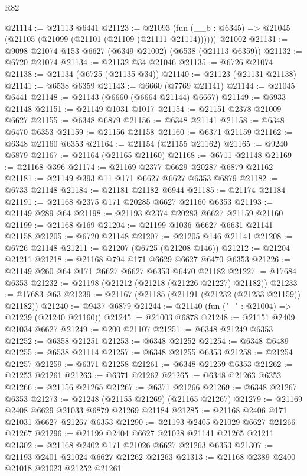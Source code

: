 \begin{lexlean}{R82}
\begin{coremodule}
@21114 := @21113 @6441
@21123 := @21093
    (fun (__b : @6345) => @21045 (@21105 (@21099 (@21101 (@21109 (@21111 @21114))))))
    @21002
@21131 := @9098 @21074 @153 @6627 (@6349 @21002) (@6538 (@21113 @6359))
@21132 := @6720 @21074
@21134 := @21132 @34 @21046
@21135 := @6726 @21074
@21138 := @21134 (@6725 (@21135 @34))
@21140 := @21123 (@21131 @21138)
@21141 := @6538 @6359
@21143 := @6660 (@7769 @21141)
@21144 := @21045 @6441
@21148 := @21143 (@6660 (@6664 @21144) @6667)
@21149 := @6933 @21148
@21151 := @21149 @1031 @1017
@21154 := @21151 @2378 @21009 @6627
@21155 := @6348 @6879
@21156 := @6348 @21141
@21158 := @6348 @6470 @6353
@21159 := @21156 @21158
@21160 := @6371 @21159
@21162 := @6348 @21160 @6353
@21164 := @21154 (@21155 @21162)
@21165 := @9240 @6879
@21167 := @21164 (@21165 @21160)
@21168 := @6711 @21148
@21169 := @21168 @396
@21174 := @21169 @2377 @6629 @20287 @6879 @21162
@21181 := @21149 @393 @11 @171 @6627 @6627 @6353 @6879
@21182 := @6733 @21148
@21184 := @21181 @21182 @6944
@21185 := @21174 @21184
@21191 := @21168 @2375 @171 @20285 @6627 @21160 @6353
@21193 := @21149 @289 @64
@21198 := @21193 @2374 @20283 @6627 @21159 @21160
@21199 := @21168 @169
@21204 := @21199 @1036 @6627 @6631 @21141 @21158
@21205 := @6720 @21148
@21207 := @21205 @146 @21141
@21208 := @6726 @21148
@21211 := @21207 (@6725 (@21208 @146))
@21212 := @21204 @21211
@21218 := @21168 @794 @171 @6629 @6627 @6470 @6353
@21226 := @21149 @260 @64 @171 @6627 @6627 @6353 @6470 @21182
@21227 := @17684 @6353
@21232 := @21198 (@21212 (@21218 (@21226 @21227) @21182))
@21233 := @17683 @63
@21239 := @21167 (@21185 (@21191 (@21232 (@21233 @21159)) @21182))
@21240 := @9437 @6879
@21244 := @21140 (fun ("_" : @21004) => @21239 (@21240 @21160))
@21245 := @21003 @6878
@21248 := @21151 @2409 @21034 @6627
@21249 := @200 @21107
@21251 := @6348 @21249 @6353
@21252 := @6358 @21251
@21253 := @6348 @21252
@21254 := @6348 @6489
@21255 := @6538 @21114
@21257 := @6348 @21255 @6353
@21258 := @21254 @21257
@21259 := @6371 @21258
@21261 := @6348 @21259 @6353
@21262 := @21253 @21261
@21263 := @6371 @21262
@21265 := @6348 @21263 @6353
@21266 := @21156 @21265
@21267 := @6371 @21266
@21269 := @6348 @21267 @6353
@21273 := @21248 (@21155 @21269) (@21165 @21267)
@21279 := @21169 @2408 @6629 @21033 @6879 @21269 @21184
@21285 := @21168 @2406 @171 @21031 @6627 @21267 @6353
@21290 := @21193 @2405 @21029 @6627 @21266 @21267
@21296 := @21199 @2404 @6627 @21028 @21141 @21265 @21211
@21302 := @21168 @2402 @171 @21026 @6627 @21263 @6353
@21307 := @21193 @2401 @21024 @6627 @21262 @21263
@21313 := @21168 @2389 @2400 @21018 @21023 @21252 @21261

\end{coremodule}
\end{lexlean}
